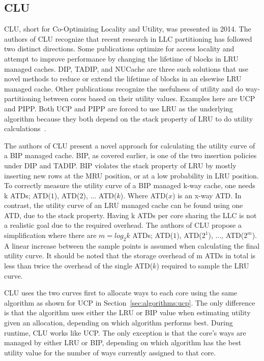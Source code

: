 
\subsection{CLU}
\label{sec:algorithms:clu}

CLU, short for Co-Optimizing Locality and Utility, was presented in 2014.
The authors of CLU recognize that recent research in LLC partitioning has followed two distinct directions.
Some publications optimize for access locality and attempt to improve performance by changing the lifetime of blocks in LRU managed caches.
DIP, TADIP, and NUCache are three such solutions that use novel methods to reduce or extend the lifetime of blocks in an elsewise LRU managed cache.
Other publications recognize the usefulness of utility and do way-partitioning between cores based on their utility values.
Examples here are UCP and PIPP.
Both UCP and PIPP are forced to use LRU as the underlying algorithm because they both depend on the stack property of LRU to do utility calculations~\cite{Qureshi2006, Xie2009}.

The authors of CLU present a novel approach for calculating the utility curve of a BIP managed cache.
BIP, as covered earlier, is one of the two insertion policies under DIP and TADIP. 
BIP violates the stack property of LRU by mostly inserting new rows at the MRU position, or at a low probability in LRU position.
To correctly measure the utility curve of a BIP managed k-way cache, one needs k ATDs; ATD($1$), ATD($2$), ... ATD($k$). 
Where ATD($x$) is an x-way ATD.
In contrast, the utility curve of an LRU managed cache can be found using one ATD, due to the stack property.
Having k ATDs per core sharing the LLC is not a realistic goal due to the required overhead.
The authors of CLU propose a simplification where there are $m = log_2 k$ ATDs; ATD($1$), ATD($2^1$), ..., ATD($2^m$).
A linear increase between the sample points is assumed when calculating the final utility curve.
It should be noted that the storage overhead of m ATDs in total is less than twice the overhead of the single ATD($k$) required to sample the LRU curve.

CLU uses the two curves first to allocate ways to each core using the same algorithm as shown for UCP in Section~\ref{sec:algorithms:ucp}.
The only difference is that the algorithm uses either the LRU or BIP value when estimating utility given an allocation, depending on which algorithm performs best.
During runtime, CLU works like UCP.
The only exception is that the core's ways are managed by either LRU or BIP, depending on which algorithm has the best utility value for the number of ways currently assigned to that core.

